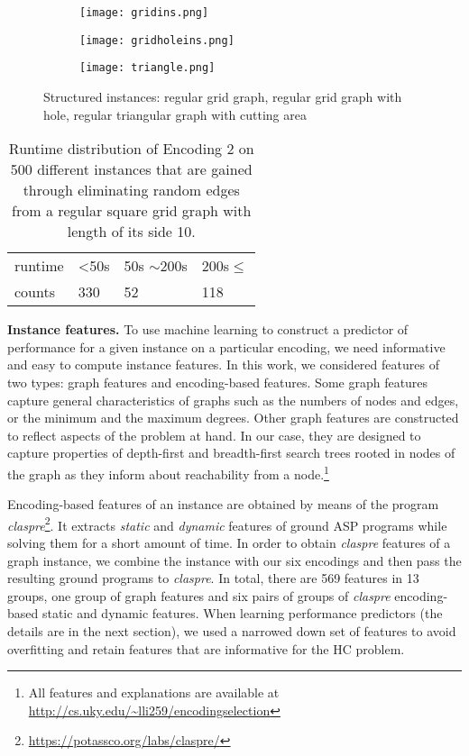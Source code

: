 \documentclass[submission,copyright,creativecommons]{eptcs}
\begin{document}
\begin{figure}
\centering

\begin{subfigure}
\centering
\texttt{[image: gridins.png]}
\end{subfigure}
\begin{subfigure}
\centering
\texttt{[image: gridholeins.png]}
\end{subfigure}
\begin{subfigure}
\centering
\texttt{[image: triangle.png]}
\end{subfigure}
\caption{Structured instances: regular grid graph, regular grid graph with hole, regular triangular graph with cutting area }\label{fig2}
\end{figure}




\begin{table}[]
\caption{Runtime distribution of Encoding 2 on 500 different instances that are gained through eliminating random edges from a regular square grid graph with length of its side 10.}\label{fig3}
\label{fig3}
\centering
\footnotesize{
\begin{tabular}{llll}
	\hline\hline
runtime & \textless{}50s & 50s $\sim$200s & 200s$\leq$ \\ 
counts   & 330            & 52             & 118  \\ 
	\hline\hline
\end{tabular}}
\centering
\end{table}

\smallskip
\noindent
\textbf{Instance features.}
To use machine learning to construct a predictor of performance for a given 
instance on a particular encoding, we need informative and easy to compute 
instance features. In this work, we considered features of two types: graph
features and encoding-based features. Some graph features capture general 
characteristics of graphs such as the numbers of nodes and edges, or the 
minimum and the maximum degrees. Other graph features are constructed to 
reflect aspects of the problem at hand. In our case, they are designed to
capture properties of depth-first and breadth-first search trees rooted in 
nodes of the graph as they inform about reachability from a node.\footnote{All 
features and explanations are available at \url{http://cs.uky.edu/~lli259/encodingselection}}  

Encoding-based features of an instance are obtained by means of the program
\emph{claspre}\footnote{\url{https://potassco.org/labs/claspre/}}. It extracts 
\emph{static} and \emph{dynamic} features of ground ASP programs while solving 
them for a short amount of time. In order to obtain \textit{claspre} features 
of a graph instance, we combine the instance with our six encodings and then 
pass the resulting ground programs to \textit{claspre}. 
In total, there are 569 features in 13
groups, one group of graph features and six pairs of groups of \textit{claspre}
encoding-based static and dynamic features. When learning performance 
predictors (the details are in the next section), we used a narrowed down set 
of features to avoid overfitting and retain features that are informative for 
the HC problem.
\end{document}
